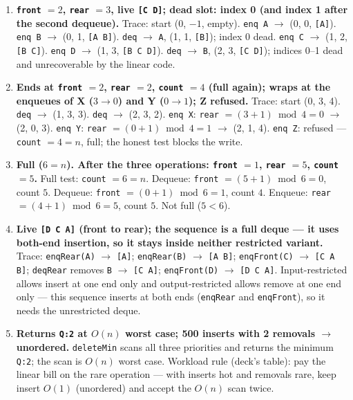 \documentclass[11pt]{article}
\begin{document}
\begingroup\small
\begin{enumerate}
  \item \textbf{\texttt{front} $= 2$, \texttt{rear} $= 3$, live \texttt{[C D]}; dead slot: index 0 (and index 1 after the second dequeue).} Trace: start (0, $-1$, empty). \texttt{enq A} $\to$ (0, 0, \texttt{[A]}). \texttt{enq B} $\to$ (0, 1, \texttt{[A B]}). \texttt{deq} $\to$ \texttt{A}, (1, 1, \texttt{[B]}); index 0 dead. \texttt{enq C} $\to$ (1, 2, \texttt{[B C]}). \texttt{enq D} $\to$ (1, 3, \texttt{[B C D]}). \texttt{deq} $\to$ \texttt{B}, (2, 3, \texttt{[C D]}); indices 0--1 dead and unrecoverable by the linear code.
  \item \textbf{Ends at \texttt{front} $= 2$, \texttt{rear} $= 2$, \texttt{count} $= 4$ (full again); wraps at the enqueues of X ($3 \to 0$) and Y ($0 \to 1$); Z refused.} Trace: start (0, 3, 4). \texttt{deq} $\to$ (1, 3, 3). \texttt{deq} $\to$ (2, 3, 2). \texttt{enq X}: \texttt{rear} $= (3+1) \bmod 4 = 0$ $\to$ (2, 0, 3). \texttt{enq Y}: \texttt{rear} $= (0+1) \bmod 4 = 1$ $\to$ (2, 1, 4). \texttt{enq Z}: refused --- \texttt{count} $= 4 = n$, full; the honest test blocks the write.
  \item \textbf{Full ($6 = n$). After the three operations: \texttt{front} $= 1$, \texttt{rear} $= 5$, \texttt{count} $= 5$.} Full test: \texttt{count} $= 6 = n$. Dequeue: \texttt{front} $= (5+1) \bmod 6 = 0$, count $5$. Dequeue: \texttt{front} $= (0+1) \bmod 6 = 1$, count $4$. Enqueue: \texttt{rear} $= (4+1) \bmod 6 = 5$, count $5$. Not full ($5 < 6$).
  \item \textbf{Live \texttt{[D C A]} (front to rear); the sequence is a full deque --- it uses both-end insertion, so it stays inside neither restricted variant.} Trace: \texttt{enqRear(A)} $\to$ \texttt{[A]}; \texttt{enqRear(B)} $\to$ \texttt{[A B]}; \texttt{enqFront(C)} $\to$ \texttt{[C A B]}; \texttt{deqRear} removes \texttt{B} $\to$ \texttt{[C A]}; \texttt{enqFront(D)} $\to$ \texttt{[D C A]}. Input-restricted allows insert at one end only and output-restricted allows remove at one end only --- this sequence inserts at both ends (\texttt{enqRear} and \texttt{enqFront}), so it needs the unrestricted deque.
  \item \textbf{Returns \texttt{Q:2} at $O(n)$ worst case; 500 inserts with 2 removals $\to$ unordered.} \texttt{deleteMin} scans all three priorities and returns the minimum \texttt{Q:2}; the scan is $O(n)$ worst case. Workload rule (deck's table): pay the linear bill on the rare operation --- with inserts hot and removals rare, keep insert $O(1)$ (unordered) and accept the $O(n)$ scan twice.
\end{enumerate}
\endgroup



\end{document}
